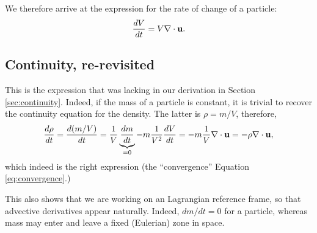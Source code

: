 We therefore arrive at the expression for the rate of change of a particle:
\[
\frac{d V}{dt} = V  \nabla\cdot \mathbf{u} .
\]

\subsection{Continuity, re-revisited}
\label{sec:continuity3}

This is the expression that was lacking in our derivation in
Section \ref{sec:continuity}. Indeed, if the mass of a particle is
constant, it is trivial to recover the continuity equation for the
density. The latter is $\rho=m/V$, therefore,
\[
\frac{d \rho }{dt} =
\frac{d (m/V) }{dt} = \frac1V \underbrace{\frac{ dm }{dt}}_{=0} -
m\frac1{V^2}  \frac{ dV }{dt } =
- m\frac1{V}  \nabla\cdot \mathbf{u}  = -\rho \nabla\cdot \mathbf{u} ,
\]
which indeed is the right expression (the ``convergence'' Equation
\ref{eq:convergence}.)

This also shows that we are working on an Lagrangian reference frame, so
that advective derivatives appear naturally. Indeed, $dm/dt=0$ for a
particle, whereas mass may enter and leave a fixed (Eulerian) zone in
space.


